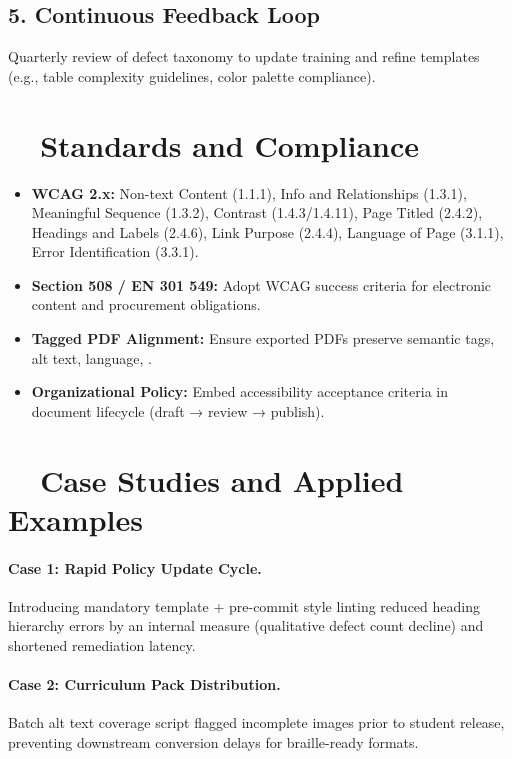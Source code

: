 \subsection*{5. Continuous Feedback Loop}
Quarterly review of defect taxonomy to update training and refine templates (e.g., table complexity guidelines, color palette compliance).

\section{~~Standards and Compliance}\label{ch20:sec:standards-compliance}
\begin{itemize}
	\item \textbf{WCAG 2.x:} Non-text Content (1.1.1), Info and Relationships (1.3.1), Meaningful Sequence (1.3.2), Contrast (1.4.3/1.4.11), Page Titled (2.4.2), Headings and Labels (2.4.6), Link Purpose (2.4.4), Language of Page (3.1.1), Error Identification (3.3.1).
	\item \textbf{Section 508 / EN 301 549:} Adopt WCAG success criteria for electronic content and procurement obligations.
	\item \textbf{Tagged PDF Alignment:} Ensure exported PDFs preserve semantic tags, alt text, language, .
	\item \textbf{Organizational Policy:} Embed accessibility acceptance criteria in document lifecycle (draft → review → publish).
\end{itemize}

\section{~~Case Studies and Applied Examples}\label{ch20:sec:case-studies}
\paragraph{Case 1: Rapid Policy Update Cycle.} Introducing mandatory template + pre-commit style linting reduced heading hierarchy errors by an internal measure (qualitative defect count decline) and shortened remediation latency.
\paragraph{Case 2: Curriculum Pack Distribution.} Batch alt text coverage script flagged incomplete images prior to student release, preventing downstream conversion delays for braille-ready formats.

